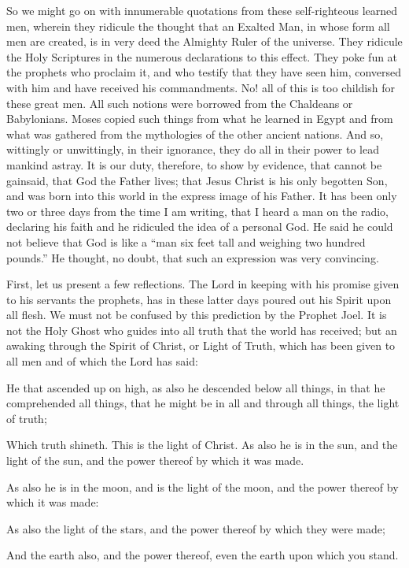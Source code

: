 So we might go on with innumerable quotations from these self-righteous learned men,
wherein they ridicule the thought that an Exalted Man, in whose form all men are created, is
in very deed the Almighty Ruler of the universe. They ridicule the Holy Scriptures in the
numerous declarations to this effect. They poke fun at the prophets who proclaim it, and who
testify that they have seen him, conversed with him and have received his commandments.
No! all of this is too childish for these great men. All such notions were borrowed from the
Chaldeans or Babylonians. Moses copied such things from what he learned in Egypt and
from what was gathered from the mythologies of the other ancient nations. And so, wittingly
or unwittingly, in their ignorance, they do all in their power to lead mankind astray. It is our
duty, therefore, to show by evidence, that cannot be gainsaid, that God the Father lives; that
Jesus Christ is his only begotten Son, and was born into this world in the express image of
his Father. It has been only two or three days from the time I am writing, that I heard a man
on the radio, declaring his faith and he ridiculed the idea of a personal God. He said he could
not believe that God is like a ``man six feet tall and weighing two hundred pounds.'' He
thought, no doubt, that such an expression was very convincing.

First, let us present a few reflections. The Lord in keeping with his promise given to his
servants the prophets, has in these latter days poured out his Spirit upon all flesh. We must
not be confused by this prediction by the Prophet Joel. It is not the Holy Ghost who guides
into all truth that the world has received; but an awaking through the Spirit of Christ, or Light
of Truth, which has been given to all men and of which the Lord has said:

He that ascended up on high, as also he descended below all things, in that he comprehended
all things, that he might be in all and through all things, the light of truth;

Which truth shineth. This is the light of Christ. As also he is in the sun, and the light of the
sun, and the power thereof by which it was made.

As also he is in the moon, and is the light of the moon, and the power thereof by which it was
made:

As also the light of the stars, and the power thereof by which they were made;

And the earth also, and the power thereof, even the earth upon which you stand.


